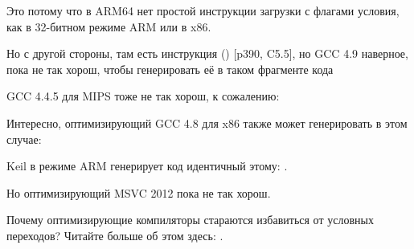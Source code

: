 Это потому что в ARM64 нет простой инструкции загрузки с флагами условия, как  в 32-битном 
режиме ARM или  в x86.

Но с другой стороны, там есть инструкция  ()
[\ARMSixFourRef p390, C5.5],
но GCC 4.9 наверное, пока не так
хорош, чтобы генерировать её в таком фрагменте кода


GCC 4.4.5 для MIPS тоже не так хорош, к сожалению:






Интересно, оптимизирующий GCC 4.8 для x86 также может генерировать  в этом случае:



\Optimizing Keil в режиме ARM генерирует код идентичный этому: .

Но оптимизирующий MSVC 2012 пока не так хорош.

\subsectionold{\Conclusion{}}

Почему оптимизирующие компиляторы стараются избавиться от условных переходов? Читайте больше об этом здесь:
 .

